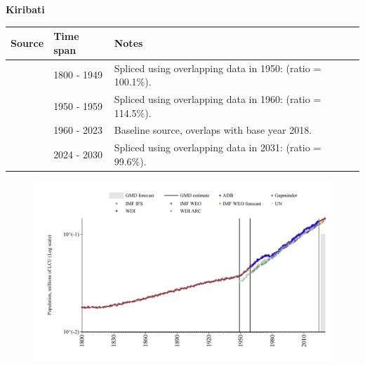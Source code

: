 \documentclass[12pt,a4paper,landscape]{article}
\begin{document}
\begin{adjustbox}{max totalsize={\paperwidth}{\paperheight},center}
\begin{minipage}[t][\textheight][t]{\textwidth}
\vspace*{0.5cm}
{}
\begin{center}
{\Large\bfseries Kiribati}
\end{center}
\vspace{0.5cm}
\begin{table}[H]
\centering
\small
\begin{tabular}{|l|l|l|}
\hline
\textbf{Source} & \textbf{Time span} & \textbf{Notes} \\
\hline
\rowcolor{white}\cite{Gapminder}& 1800 - 1949 &Spliced using overlapping data in 1950: (ratio = 100.1\%).\\
\rowcolor{lightgray}\cite{IMF_IFS}& 1950 - 1959 &Spliced using overlapping data in 1960: (ratio = 114.5\%).\\
\rowcolor{white}\cite{WDI}& 1960 - 2023 &Baseline source, overlaps with base year 2018.\\
\rowcolor{lightgray}\cite{Gapminder}& 2024 - 2030 &Spliced using overlapping data in 2031: (ratio = 99.6\%).\\
\hline
\end{tabular}
\end{table}
\begin{figure}[H]
\centering
\includegraphics[width=\textwidth,height=0.6\textheight,keepaspectratio]{graphs/KIR_pop.pdf}
\end{figure}
\end{minipage}
\end{adjustbox}
\end{document}
